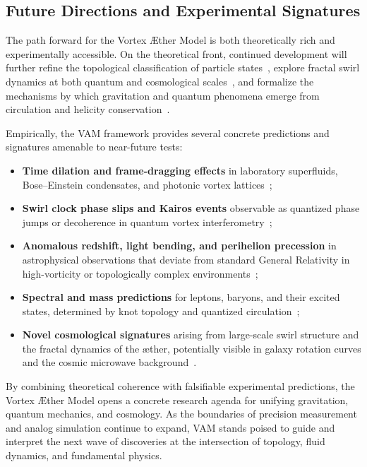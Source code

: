 \documentclass[preprint,notitlepage]{revtex4-2}
\begin{document}
\subsection*{Future Directions and Experimental Signatures}

The path forward for the Vortex Æther Model is both theoretically rich and experimentally accessible. On the theoretical front, continued development will further refine the topological classification of particle states~\cite{VAM-11, VAM-14}, explore fractal swirl dynamics at both quantum and cosmological scales~\cite{VAM-12, VAM-9}, and formalize the mechanisms by which gravitation and quantum phenomena emerge from circulation and helicity conservation~\cite{VAM-13, VAM-15}.

Empirically, the VAM framework provides several concrete predictions and signatures amenable to near-future tests:
\begin{itemize}
    \item \textbf{Time dilation and frame-dragging effects} in laboratory superfluids, Bose–Einstein condensates, and photonic vortex lattices~\cite{VAM-2, VAM-13};
    \item \textbf{Swirl clock phase slips and Kairos events} observable as quantized phase jumps or decoherence in quantum vortex interferometry~\cite{VAM-15};
    \item \textbf{Anomalous redshift, light bending, and perihelion precession} in astrophysical observations that deviate from standard General Relativity in high-vorticity or topologically complex environments~\cite{VAM-10};
    \item \textbf{Spectral and mass predictions} for leptons, baryons, and their excited states, determined by knot topology and quantized circulation~\cite{VAM-11, VAM-14};
    \item \textbf{Novel cosmological signatures} arising from large-scale swirl structure and the fractal dynamics of the æther, potentially visible in galaxy rotation curves and the cosmic microwave background~\cite{VAM-9, VAM-12}.
\end{itemize}

By combining theoretical coherence with falsifiable experimental predictions, the Vortex Æther Model opens a concrete research agenda for unifying gravitation, quantum mechanics, and cosmology. As the boundaries of precision measurement and analog simulation continue to expand, VAM stands poised to guide and interpret the next wave of discoveries at the intersection of topology, fluid dynamics, and fundamental physics.
\end{document}
